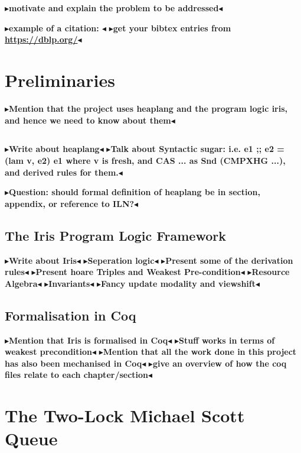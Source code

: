 \documentclass[twoside,11pt,openright]{report}
\newcommand{\todo}[1]{{\color[rgb]{.5,0,0}\textbf{$\blacktriangleright$#1$\blacktriangleleft$}}}
\begin{document}
\todo{motivate and explain the problem to be addressed}

\todo{example of a citation: \cite{DBLP:conf/podc/MichaelS96}}
\todo{get your bibtex entries from \url{https://dblp.org/}}


\chapter{Preliminaries}
\label{ch:preliminaries}

\todo{Mention that the project uses heaplang and the program logic iris, and hence we need to know about them}


\section{\heaplang}
\label{Pre:section:heaplang}

\todo{Write about heaplang}
\todo{Talk about Syntactic sugar: i.e. e1 ;; e2 = (lam v, e2) e1 where v is fresh, and CAS ... as Snd (CMPXHG ...), and derived rules for them.}

\todo{Question: should formal definition of heaplang be in section, appendix, or reference to ILN?}

\section{The Iris Program Logic Framework}
\label{Pre:section:iris}

\todo{Write about Iris}
\todo{Seperation logic}
\todo{Present some of the derivation rules}
\todo{Present hoare Triples and Weakest Pre-condition}
\todo{Resource Algebra}
\todo{Invariants}
\todo{Fancy update modality and viewshift}


\section{Formalisation in Coq}
\label{Pre:section:coq}

\todo{Mention that Iris is formalised in Coq}
\todo{Stuff works in terms of weakest precondition}
\todo{Mention that all the work done in this project has also been mechanised in Coq}
\todo{give an overview of how the coq files relate to each chapter/section}

\chapter{The Two-Lock Michael Scott Queue}
\label{ch:TLMSQ}
\end{document}
